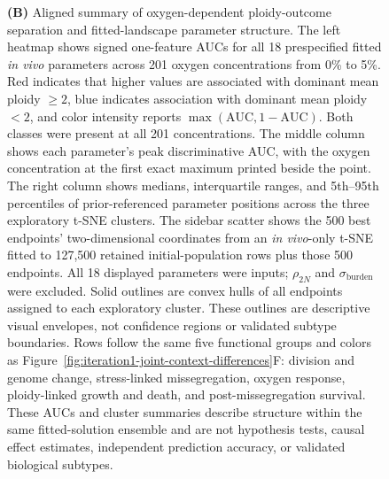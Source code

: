 \documentclass[11pt]{article}
\begin{document}
\begin{figure}[!htbp]
{\textbf{(B)} Aligned summary of oxygen-dependent ploidy-outcome separation and fitted-landscape parameter structure. The left heatmap shows signed one-feature AUCs for all 18 prespecified fitted \textit{in vivo} parameters across 201 oxygen concentrations from 0\% to 5\%. Red indicates that higher values are associated with dominant mean ploidy \(\geq2\), blue indicates association with dominant mean ploidy \(<2\), and color intensity reports \(\max(\mathrm{AUC},1-\mathrm{AUC})\). Both classes were present at all 201 concentrations. The middle column shows each parameter's peak discriminative AUC, with the oxygen concentration at the first exact maximum printed beside the point. The right column shows medians, interquartile ranges, and 5th--95th percentiles of prior-referenced parameter positions across the three exploratory t-SNE clusters. The sidebar scatter shows the 500 best endpoints' two-dimensional coordinates from an \textit{in vivo}-only t-SNE fitted to 127,500 retained initial-population rows plus those 500 endpoints. All 18 displayed parameters were inputs; \(\rho_{2N}\) and \(\sigma_{\mathrm{burden}}\) were excluded. Solid outlines are convex hulls of all endpoints assigned to each exploratory cluster. These outlines are descriptive visual envelopes, not confidence regions or validated subtype boundaries. Rows follow the same five functional groups and colors as Figure~\ref{fig:iteration1-joint-context-differences}F: division and genome change, stress-linked missegregation, oxygen response, ploidy-linked growth and death, and post-missegregation survival. These AUCs and cluster summaries describe structure within the same fitted-solution ensemble and are not hypothesis tests, causal effect estimates, independent prediction accuracy, or validated biological subtypes.}
\label{fig:iteration1-invivo-resource-regimes-landscape}
\end{figure}
\end{document}
